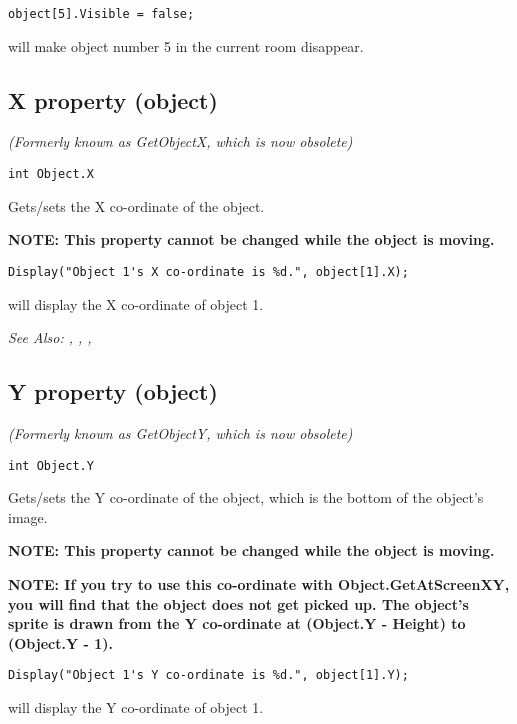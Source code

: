 \begin{verbatim}
object[5].Visible = false;
\end{verbatim}
will make object number 5 in the current room disappear.


\subsection{X property (object)}\label{Object.X}%

\it{(Formerly known as GetObjectX, which is now obsolete)}

\begin{verbatim}
int Object.X
\end{verbatim}
Gets/sets the X co-ordinate of the object.

\bf{NOTE:} This property cannot be changed while the object is moving.

\begin{verbatim}
Display("Object 1's X co-ordinate is %d.", object[1].X);
\end{verbatim}
will display the X co-ordinate of object 1.

\it{See Also:} , ,
, 


\subsection{Y property (object)}\label{Object.Y}%

\it{(Formerly known as GetObjectY, which is now obsolete)}

\begin{verbatim}
int Object.Y
\end{verbatim}
Gets/sets the Y co-ordinate of the object, which is the bottom of the object's image.

\bf{NOTE:} This property cannot be changed while the object is moving.

\bf{NOTE:} If you try to use this co-ordinate with Object.GetAtScreenXY, you will find that
the object does not get picked up. The object's sprite is drawn from the Y co-ordinate
at (Object.Y - Height) to (Object.Y - 1).

\begin{verbatim}
Display("Object 1's Y co-ordinate is %d.", object[1].Y);
\end{verbatim}
will display the Y co-ordinate of object 1.

